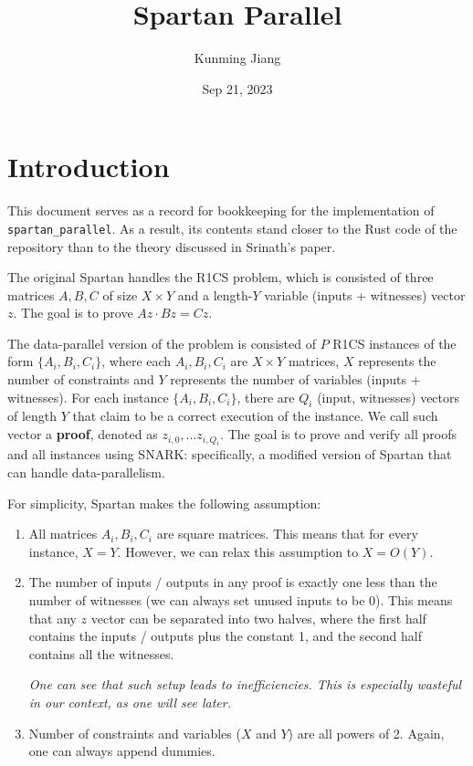 \documentclass{article}
\title{Spartan Parallel}
\author{Kunming Jiang}
\date{Sep 21, 2023}
\newcommand{\code}{\texttt}
\begin{document}
\maketitle

\section{Introduction}\label{intro}

This document serves as a record for bookkeeping for the implementation of \code{spartan\_parallel}. As a result, its contents stand closer to the Rust code of the repository than to the theory discussed in Srinath's paper.

The original Spartan handles the R1CS problem, which is consisted of three matrices $A, B, C$ of size $X \times Y$ and a length-$Y$ variable (inputs + witnesses) vector $z$. The goal is to prove $Az\cdot Bz = Cz$.

The data-parallel version of the problem is consisted of $P$ R1CS instances of the form $\{A_i, B_i, C_i\}$, where each $A_i, B_i, C_i$ are $X \times Y$ matrices, $X$ represents the number of constraints and $Y$ represents the number of variables (inputs + witnesses). For each instance $\{A_i, B_i, C_i\}$, there are $Q_i$ (input, witnesses) vectors of length $Y$ that claim to be a correct execution of the instance. We call such vector a \textbf{proof}, denoted as $z_{i, 0},\dots z_{i, Q_i}$. The goal is to prove and verify all proofs and all instances using SNARK: specifically, a modified version of Spartan that can handle data-parallelism.

For simplicity, Spartan makes the following assumption:
\begin{enumerate}
    \item All matrices $A_i, B_i, C_i$ are square matrices. This means that for every instance, $X = Y$. However, we can relax this assumption to $X = O(Y)$. \label{ass:square}

    \item The number of inputs / outputs in any proof is exactly one less than the number of witnesses (we can always set unused inputs to be 0). This means that any $z$ vector can be separated into two halves, where the first half contains the inputs / outputs plus the constant 1, and the second half contains all the witnesses. \label{ass:num_of_inputs}
    
    \emph{One can see that such setup leads to inefficiencies. This is especially wasteful in our context, as one will see later.}

    \item Number of constraints and variables ($X$ and $Y$) are all powers of 2. Again, one can always append dummies. \label{ass:x_y_pow2}
\end{enumerate}
\end{document}
